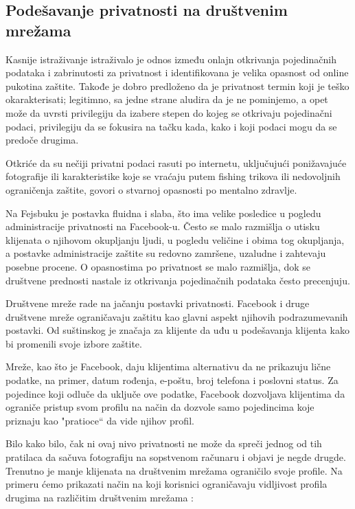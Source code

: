 \documentclass[a4paper]{article}
\begin{document}
\subsection{Podešavanje privatnosti na društvenim  mrežama}
 Kasnije istraživanje istraživalo je odnos između onlajn otkrivanja pojedinačnih podataka i zabrinutosti za privatnost i identifikovana je velika opasnost od online pukotina zaštite.  Takođe je dobro predloženo  da je privatnost termin koji je teško okarakterisati; legitimno, sa jedne strane aludira  da je ne pominjemo, a opet može da uvrsti privilegiju da izabere stepen do kojeg se otkrivaju pojedinačni podaci, privilegiju da se fokusira na tačku kada, kako i koji  podaci mogu da se predoče  drugima. \par Otkriće da su nečiji privatni podaci rasuti  po internetu, uključujući  ponižavajuće fotografije ili karakteristike  koje se vraćaju putem fishing  trikova ili nedovoljnih ograničenja zaštite, govori o stvarnoj opasnosti po mentalno zdravlje. 
 \par Na  Fejsbuku je  postavka  fluidna i slaba, što ima velike posledice u pogledu administracije privatnosti na Facebook-u.  Često se malo  razmišlja o utisku  klijenata o njihovom okupljanju ljudi, u pogledu  veličine i obima  tog okupljanja, a  postavke administracije zaštite su redovno zamršene, uzaludne i zahtevaju posebne procene. O opasnostima po privatnost se malo razmišlja, dok se društvene prednosti nastale iz otkrivanja pojedinačnih podataka često precenjuju.\par  Društvene mreže rade na jačanju postavki privatnosti. Facebook i druge društvene mreže ograničavaju zaštitu kao glavni aspekt njihovih podrazumevanih postavki. Od suštinskog je značaja za klijente da uđu u podešavanja klijenta kako bi promenili svoje izbore zaštite. \par  Mreže, kao  što je Facebook, daju   klijentima alternativu da ne   prikazuju  lične podatke, na primer, datum rođenja, e-poštu, broj telefona i poslovni status. Za pojedince koji odluče da uključe ove podatke, Facebook dozvoljava klijentima da ograniče pristup svom profilu na način da dozvole samo pojedincima koje priznaju  kao "pratioce“ da vide njihov profil. \par  Bilo kako bilo, čak ni ovaj nivo privatnosti ne može da spreči jednog od tih pratilaca da sačuva fotografiju na sopstvenom računaru i objavi je negde drugde. Trenutno je manje klijenata na društvenim mrežama  ograničilo svoje profile. 
Na primeru ćemo prikazati način na koji korisnici ograničavaju  vidljivost profila drugima na različitim društvenim mrežama :
\end{document}
